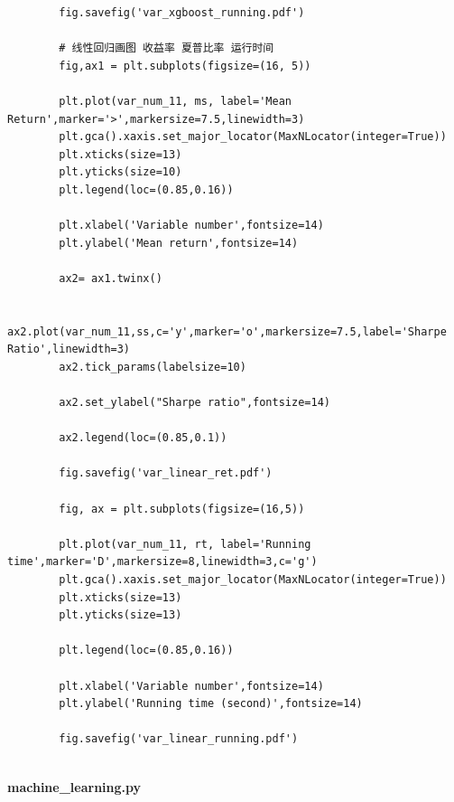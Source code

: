 \documentclass[12pt]{article} %
\begin{document}
\begin{lstlisting}
		fig.savefig('var_xgboost_running.pdf')
		
		# 线性回归画图 收益率 夏普比率 运行时间
		fig,ax1 = plt.subplots(figsize=(16, 5))
		
		plt.plot(var_num_11, ms, label='Mean Return',marker='>',markersize=7.5,linewidth=3)
		plt.gca().xaxis.set_major_locator(MaxNLocator(integer=True))
		plt.xticks(size=13)
		plt.yticks(size=10)
		plt.legend(loc=(0.85,0.16))
		
		plt.xlabel('Variable number',fontsize=14) 
		plt.ylabel('Mean return',fontsize=14)
		
		ax2= ax1.twinx()
		
		ax2.plot(var_num_11,ss,c='y',marker='o',markersize=7.5,label='Sharpe Ratio',linewidth=3)
		ax2.tick_params(labelsize=10)
		
		ax2.set_ylabel("Sharpe ratio",fontsize=14)
		
		ax2.legend(loc=(0.85,0.1))
		
		fig.savefig('var_linear_ret.pdf')
		
		fig, ax = plt.subplots(figsize=(16,5))
		
		plt.plot(var_num_11, rt, label='Running time',marker='D',markersize=8,linewidth=3,c='g')
		plt.gca().xaxis.set_major_locator(MaxNLocator(integer=True))
		plt.xticks(size=13)
		plt.yticks(size=13)
		
		plt.legend(loc=(0.85,0.16))
		
		plt.xlabel('Variable number',fontsize=14) 
		plt.ylabel('Running time (second)',fontsize=14)
		
		fig.savefig('var_linear_running.pdf')
	\end{lstlisting}
	~\\
	\textbf{machine\_learning.py}
\end{document}
